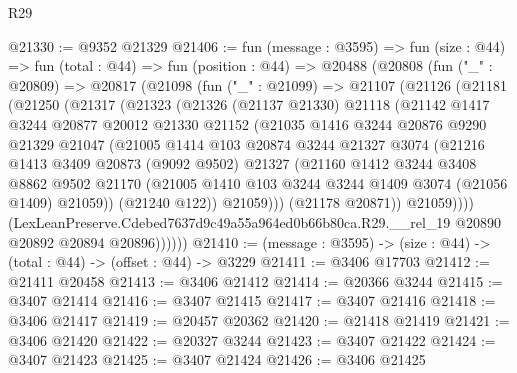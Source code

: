 \begin{lexlean}{R29}
\begin{coremodule}
@21330 := @9352 @21329
@21406 := fun (message : @3595) =>
  fun (size : @44) =>
  fun (total : @44) =>
  fun (position : @44) =>
  @20488
    (@20808
      (fun ("_" : @20809) =>
      @20817
        (@21098
          (fun ("_" : @21099) =>
          @21107
            (@21126
              (@21181
                (@21250
                  (@21317
                    (@21323
                      (@21326
                        (@21137 @21330)
                        @21118
                        (@21142
                          @1417
                          @3244
                          @20877
                          @20012
                          @21330
                          @21152
                          (@21035
                            @1416
                            @3244
                            @20876
                            @9290
                            @21329
                            @21047
                            (@21005
                              @1414
                              @103
                              @20874
                              @3244
                              @21327
                              @3074
                              (@21216
                                @1413
                                @3409
                                @20873
                                (@9092 @9502)
                                @21327
                                (@21160
                                  @1412
                                  @3244
                                  @3408
                                  @8862
                                  @9502
                                  @21170
                                  (@21005 @1410 @103 @3244 @3244 @1409 @3074 (@21056 @1409) @21059))
                                (@21240 @122))
                              @21059)))
                        (@21178 @20871))
                      @21059))))
              (LexLeanPreserve.Cdebed7637d9c49a55a964ed0b66b80ca.R29.__rel_19
                @20890
                @20892
                @20894
                @20896))))))
@21410 := (message : @3595) -> (size : @44) -> (total : @44) -> (offset : @44) -> @3229
@21411 := @3406 @17703
@21412 := @21411 @20458
@21413 := @3406 @21412
@21414 := @20366 @3244
@21415 := @3407 @21414
@21416 := @3407 @21415
@21417 := @3407 @21416
@21418 := @3406 @21417
@21419 := @20457 @20362
@21420 := @21418 @21419
@21421 := @3406 @21420
@21422 := @20327 @3244
@21423 := @3407 @21422
@21424 := @3407 @21423
@21425 := @3407 @21424
@21426 := @3406 @21425

\end{coremodule}
\end{lexlean}
